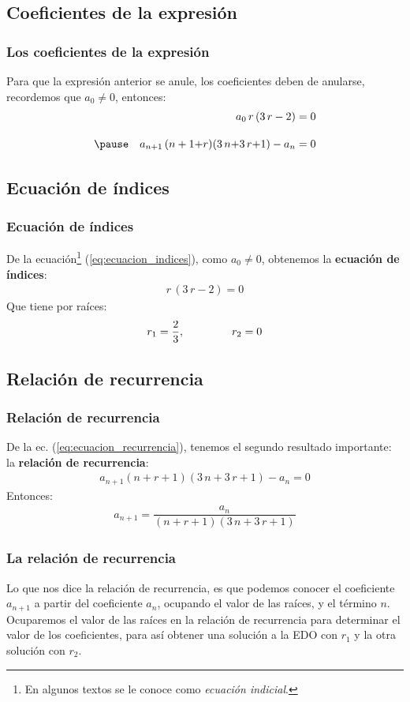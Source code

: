 \documentclass[12pt]{beamer}
\begin{document}
\subsection*{Coeficientes de la expresión}

\begin{frame}
\frametitle{Los coeficientes de la expresión}
Para que la expresión anterior se anule, los coeficientes deben de anularse, recordemos que $a_{0} \neq 0$, entonces:
\pause
\begin{eqnarray}
&{}& a_{0} \, r \, (3 \, r - 2) = 0 \label{eq:ecuacion_indices}\\[1em] \pause
&{}& a_{n+1} \, (n + 1 {+} r) (3 \, n {+}  3 \, r {+} 1 ) - a_{n} = 0 \label{eq:ecuacion_recurrencia}
\end{eqnarray}
\end{frame}

\subsection*{Ecuación de índices}

\begin{frame}
\frametitle{Ecuación de índices}
De la ecuación\footnote{En algunos textos se le conoce como \emph{ecuación indicial}.} (\ref{eq:ecuacion_indices}), como $a_{0} \neq 0$, obtenemos la \textbf{ecuación de índices}:
\pause
\begin{align*}
r \, (3 \, r - 2) = 0
\end{align*}
\pause
Que tiene por raíces:
\pause
\begin{align*}
r_{1} = \dfrac{2}{3}, \hspace{1.5cm} r_{2} = 0
\end{align*}
\end{frame}

\subsection*{Relación de recurrencia}

\begin{frame}
\frametitle{Relación de recurrencia}
De la ec. (\ref{eq:ecuacion_recurrencia}), tenemos el segundo resultado importante: la \textbf{relación de recurrencia}:
\begin{align*}
a_{n+1} (n + r + 1)(3 \, n + 3 \, r + 1) - a_{n} = 0
\end{align*}
\pause
Entonces:
\begin{align}
a_{n+1} = \dfrac{a_{n}}{(n + r + 1)(3 \, n + 3 \, r + 1)}
\label{eq:ecuacion_07}
\end{align}
\end{frame}
\begin{frame}
\frametitle{La relación de recurrencia}
Lo que nos dice la relación de recurrencia, es que podemos conocer el coeficiente $a_{n+1}$ a partir del coeficiente $a_{n}$, ocupando el valor de las raíces, y el término $n$.
\\
\bigskip
\pause
Ocuparemos el valor de las raíces en la relación de recurrencia para determinar el valor de los coeficientes, para así obtener una solución a la EDO con $r_{1}$ y la otra solución con $r_{2}$.
\end{frame}
\end{document}
